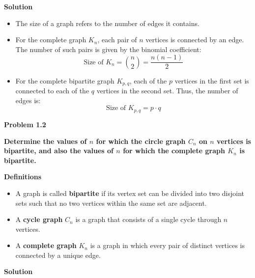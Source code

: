\documentclass{article}
\begin{document}
\textbf{Solution}

\begin{itemize}
    \item The size of a graph refers to the number of edges it contains.
    
    \item For the complete graph $K_n$, each pair of $n$ vertices is connected by an edge. The number of such pairs is given by the binomial coefficient:
    \[
    \text{Size of } K_n = \binom{n}{2} = \frac{n(n-1)}{2}
    \]

    \item For the complete bipartite graph $K_{p,q}$, each of the $p$ vertices in the first set is connected to each of the $q$ vertices in the second set. Thus, the number of edges is:
    \[
    \text{Size of } K_{p,q} = p \cdot q
    \]
\end{itemize}

\textbf{Problem 1.2}

\textbf{Determine the values of $n$ for which the circle graph $C_n$ on $n$ vertices is bipartite, and also the values of $n$ for which the complete graph $K_n$ is bipartite.}

\textbf{Definitions}

\begin{itemize}
    \item A graph is called \textbf{bipartite} if its vertex set can be divided into two disjoint sets such that no two vertices within the same set are adjacent.
    \item A \textbf{cycle graph} $C_n$ is a graph that consists of a single cycle through $n$ vertices.
    \item A \textbf{complete graph} $K_n$ is a graph in which every pair of distinct vertices is connected by a unique edge.
\end{itemize}

\textbf{Solution}
\end{document}
